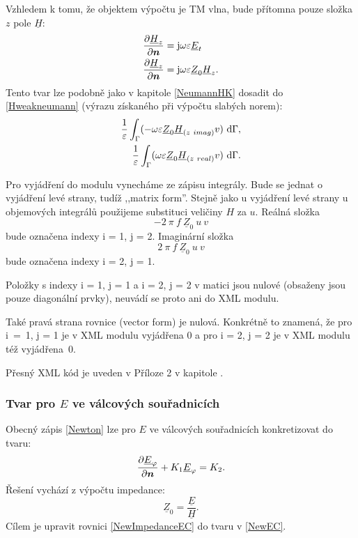 \documentclass[12pt,a4paper,oneside]{article}
\numberwithin{equation}{section} %
\numberwithin{figure}{section} %
\numberwithin{table}{section} %
\newcommand{\mj}{\mathrm{j}} %
\renewcommand{\vec}[1]{\mbox{\boldmath$#1$}} %
\newcommand{\faz}[1]{{\underline{#1}}} %
\begin{document}
Vzhledem k tomu, že objektem výpočtu je TM vlna, bude přítomna pouze složka $z$ pole $\faz{H}$:
\begin{subequations}
\begin{align}
\frac{\partial \faz{H} _z}{\partial \vec{n}} &= \mj \omega \varepsilon \faz{E} _t
\\
\frac{\partial \faz{H} _z}{\partial \vec{n}} &= \mj \omega \varepsilon \faz{Z} _0 \faz{H} _z .
\end{align}
\end{subequations}
Tento tvar lze podobně jako v kapitole \ref{NeumannHK} dosadit do \ref{Hweakneumann} (výrazu získaného při výpočtu slabých norem):
\begin{subequations}
\begin{align}
\frac{1}{\varepsilon} \int _{\Gamma} ( - \omega \varepsilon \faz{Z} _0 \faz{H} _{(z~imag)} v ) ~ \ud \Gamma ,
\\ 
\frac{1}{\varepsilon} \int _{\Gamma} ( \omega \varepsilon \faz{Z} _0\faz{H} _{(z~real)} v ) ~ \ud \Gamma .
\end{align}
\end{subequations}

Pro vyjádření do modulu vynecháme ze zápisu integrály. Bude se jednat o vyjádření levé strany, tudíž ,,matrix form''. Stejně jako u vyjádření levé strany u objemových integrálů použijeme substituci veličiny $H$ za $u$. Reálná složka 
\begin{equation}
- 2 ~ \pi ~ f ~ \faz{Z} _0 ~ u ~ v
\end{equation} 
bude označena indexy i = 1, j = 2. Imaginární složka 
\begin{equation}
2 ~ \pi ~ f ~ \faz{Z} _0 ~ u ~ v
\end{equation}
bude označena indexy i = 2, j = 1.

Položky s indexy i = 1, j = 1 a i = 2, j = 2 v matici jsou nulové (obsaženy jsou pouze diagonální prvky), neuvádí se proto ani do XML modulu.

Také pravá strana rovnice (vector form) je nulová. Konkrétně to znamená, že pro i~=~1, j = 1 je v XML modulu vyjádřena $0$ a pro i = 2, j = 2 je v XML modulu též vyjádřena~$0$.

Přesný XML kód je uveden v Příloze 2 v kapitole .



\subsubsection*{Tvar pro \faz{\vec{E}} ve válcových souřadnicích}
Obecný zápis \ref{Newton} lze pro \faz{\vec{E}} ve válcových souřadnicích konkretizovat do tvaru:
\begin{equation}
\label{NewEC}
\frac{\partial \faz{E} _{\varphi}}{\partial \vec{n}} + K_1 \faz{E} _{\varphi} = K_2 .
\end{equation}
Řešení vychází z výpočtu impedance: 
\begin{equation}
\label{NewImpedanceEC}
\faz{Z} _0 = \frac{\faz{E}}{\faz{H}} .
\end{equation}
Cílem je upravit rovnici \ref{NewImpedanceEC} do tvaru v \ref{NewEC}.
\end{document}
